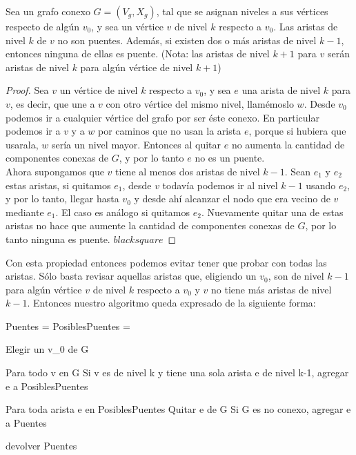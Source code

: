 \begin{proposition}
Sea un grafo conexo $G=(V_g, X_g)$, tal que se asignan niveles a sus vértices respecto de algún $v_0$, y sea un vértice $v$ de nivel $k$ respecto a $v_0$. Las aristas de nivel $k$ de $v$ no son puentes. 
Además, si existen dos o más aristas de nivel $k-1$, entonces ninguna de ellas es puente. (Nota: las aristas de nivel $k+1$ para $v$ serán aristas de nivel $k$ para algún vértice de nivel $k+1$)
\end{proposition}

\begin{proof}
Sea $v$ un vértice de nivel $k$ respecto a $v_0$, y sea $e$ una arista de nivel $k$ para $v$, es decir, que une a $v$ con otro vértice del mismo nivel, llamémoslo $w$. Desde $v_0$ podemos ir a cualquier 
vértice del grafo por ser éste conexo. En particular podemos ir a $v$ y a $w$ por caminos que no usan la arista $e$, porque si hubiera que usarala, $w$ sería un nivel mayor. Entonces al quitar 
$e$ no aumenta la cantidad de componentes conexas de $G$, y por lo tanto $e$ no es un puente. \\
Ahora supongamos que $v$ tiene al menos dos aristas de nivel $k-1$. Sean $e_1$ y $e_2$ estas aristas, si quitamos $e_1$, desde $v$ todavía podemos ir al nivel $k-1$ usando $e_2$, y por 
lo tanto, llegar hasta $v_0$ y desde ahí alcanzar el nodo que era vecino de $v$ mediante $e_1$. El caso es análogo si quitamos $e_2$. Nuevamente quitar una de estas aristas no hace que aumente 
la cantidad de componentes conexas de $G$, por lo tanto ninguna es puente. $blacksquare$ 
\end{proof}

Con esta propiedad entonces podemos evitar tener que probar con todas las aristas. Sólo basta revisar aquellas aristas que, eligiendo un $v_0$, son de nivel $k-1$ para algún vértice $v$ de nivel 
$k$ respecto a $v_0$ y $v$ no tiene más aristas de nivel $k-1$. Entonces nuestro algoritmo queda expresado de la siguiente forma:

\begin{verbatimtab}
Puentes 	= {}
PosiblesPuentes = {}

Elegir un v_0 de G

Para todo v en G
    Si v es de nivel k y tiene una sola arista e de nivel k-1, agregar e a PosiblesPuentes

Para toda arista e en PosiblesPuentes
    Quitar e de G
    Si G es no conexo, agregar e a Puentes

devolver Puentes
\end{verbatimtab}


